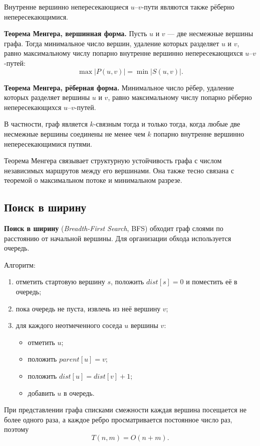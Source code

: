 Внутренне вершинно непересекающиеся $u$--$v$-пути являются также рёберно непересекающимися.

\textbf{Теорема Менгера, вершинная форма.}
Пусть $u$ и $v$ --- две несмежные вершины графа. Тогда минимальное число вершин, удаление которых разделяет $u$ и $v$, равно максимальному числу попарно внутренне вершинно непересекающихся
$u$--$v$-путей:
\[
\max |P(u,v)|=\min |S(u,v)|.
\]

\textbf{Теорема Менгера, рёберная форма.}
Минимальное число рёбер, удаление которых разделяет вершины $u$ и $v$, равно максимальному числу попарно рёберно непересекающихся
$u$--$v$-путей.

В частности, граф является $k$-связным тогда и только тогда, когда любые две несмежные вершины соединены не менее чем $k$ попарно внутренне вершинно непересекающимися путями.

Теорема Менгера связывает структурную устойчивость графа с числом независимых маршрутов между его вершинами. Она также тесно связана с теоремой о максимальном потоке и минимальном разрезе.

\subsection{Поиск в ширину}

\textbf{Поиск в ширину} (\textit{Breadth-First Search}, BFS) обходит граф слоями по расстоянию от начальной вершины. Для организации обхода используется очередь.

Алгоритм:
\begin{enumerate}
	\item отметить стартовую вершину $s$, положить $dist[s]=0$ и поместить её в очередь;
	\item пока очередь не пуста, извлечь из неё вершину $v$;
	\item для каждого неотмеченного соседа $u$ вершины $v$:
	\begin{itemize}
		\item отметить $u$;
		\item положить $parent[u]=v$;
		\item положить $dist[u]=dist[v]+1$;
		\item добавить $u$ в очередь.
	\end{itemize}
\end{enumerate}

При представлении графа списками смежности каждая вершина посещается не более одного раза, а каждое ребро просматривается постоянное число раз, поэтому
\[
T(n,m)=O(n+m).
\]

